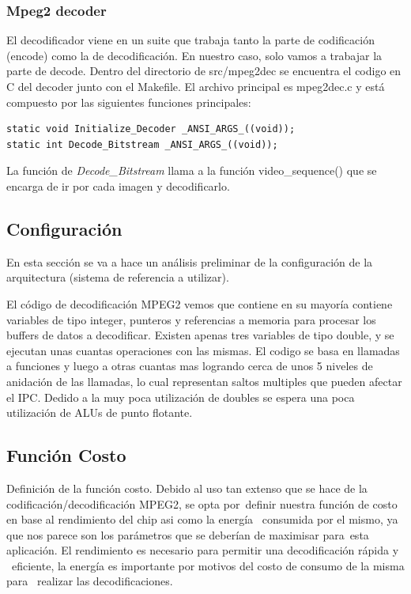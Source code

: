 \documentclass[journal]{IEEEtran}
\begin{document}
\subsubsection{Mpeg2 decoder}
El decodificador viene en un suite que trabaja tanto la parte de codificaci\'{o}n (encode) como la de decodificaci\'{o}n. En nuestro caso, solo vamos a trabajar la parte de decode.
Dentro del directorio de src/mpeg2dec se encuentra el codigo en C del decoder junto con el Makefile. El archivo principal es mpeg2dec.c y est\'{a} compuesto por las siguientes funciones principales:

\footnotesize \begin{verbatim}
static void Initialize_Decoder _ANSI_ARGS_((void));
static int Decode_Bitstream _ANSI_ARGS_((void));
\end{verbatim}
\normalsize

La funci\'{o}n de \textit{Decode\_Bitstream} llama a la funci\'{o}n video\_sequence() que se encarga de ir por cada imagen y decodificarlo. \newline

\subsection{Configuraci\'{o}n}
En esta secci\'{o}n se va a hace un an\'{a}lisis preliminar de la configuraci\'{o}n de la arquitectura (sistema de referencia a utilizar).

El c\'odigo de decodificaci\'on MPEG2 vemos que contiene en su mayor\'ia contiene variables de tipo integer, punteros y referencias a memoria para procesar los buffers de datos a decodificar. Existen apenas tres variables de tipo double, y se ejecutan unas cuantas operaciones con las mismas.  El codigo se basa en llamadas a funciones y luego a otras cuantas mas logrando cerca de unos 5 niveles de anidaci\'on de las llamadas, lo cual representan saltos multiples que pueden afectar el IPC.
Dedido a la muy poca utilizaci\'on de doubles se espera una poca utilizaci\'on de ALUs de punto flotante. \newline

\subsection{Funci\'{o}n Costo}
Definici\'{o}n de la funci\'{o}n costo.
Debido al uso tan extenso que se hace de la codificaci\'{o}n/decodificaci\'{o}n MPEG2, se opta por\
definir nuestra funci\'{o}n de costo en base al rendimiento del chip asi como la energ\'{i}a \
consumida por el mismo, ya que nos parece son los par\'{a}metros que se deber\'{i}an de maximisar para\
esta aplicaci\'{o}n.  El rendimiento es necesario para permitir una decodificaci\'{o}n r\'{a}pida y \
eficiente, la energ\'{i}a es importante por motivos del costo de consumo de la misma para \
realizar las decodificaciones.
\end{document}
